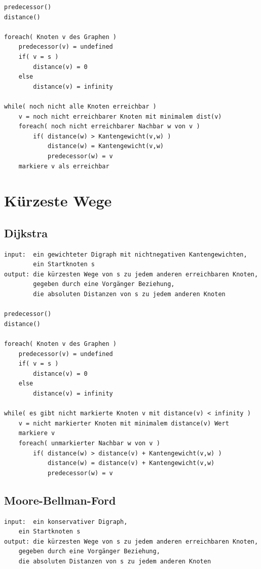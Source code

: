 \documentclass[10pt,a4paper,landscape]{article}
\begin{document}
\begin{multicols*}{2}
\begin{verbatim}
predecessor()
distance()

foreach( Knoten v des Graphen )
    predecessor(v) = undefined
    if( v = s )
        distance(v) = 0
    else
        distance(v) = infinity

while( noch nicht alle Knoten erreichbar )
    v = noch nicht erreichbarer Knoten mit minimalem dist(v)
    foreach( noch nicht erreichbarer Nachbar w von v )
        if( distance(w) > Kantengewicht(v,w) )
            distance(w) = Kantengewicht(v,w)
            predecessor(w) = v
    markiere v als erreichbar
    \end{verbatim}


\section{ Kürzeste Wege }
    \subsection{ Dijkstra }
    \begin{verbatim}
input:  ein gewichteter Digraph mit nichtnegativen Kantengewichten,
        ein Startknoten s
output: die kürzesten Wege von s zu jedem anderen erreichbaren Knoten, 
        gegeben durch eine Vorgänger Beziehung,
        die absoluten Distanzen von s zu jedem anderen Knoten

predecessor()
distance()

foreach( Knoten v des Graphen )
    predecessor(v) = undefined
    if( v = s )
        distance(v) = 0
    else
        distance(v) = infinity

while( es gibt nicht markierte Knoten v mit distance(v) < infinity )
    v = nicht markierter Knoten mit minimalem distance(v) Wert
    markiere v
    foreach( unmarkierter Nachbar w von v )
        if( distance(w) > distance(v) + Kantengewicht(v,w) )
            distance(w) = distance(v) + Kantengewicht(v,w)
            predecessor(w) = v
    \end{verbatim}

    \subsection{ Moore-Bellman-Ford }
    \begin{verbatim}
input:  ein konservativer Digraph,
    ein Startknoten s
output: die kürzesten Wege von s zu jedem anderen erreichbaren Knoten, 
    gegeben durch eine Vorgänger Beziehung,
    die absoluten Distanzen von s zu jedem anderen Knoten
    

\end{verbatim}
\end{multicols*}
\end{document}
